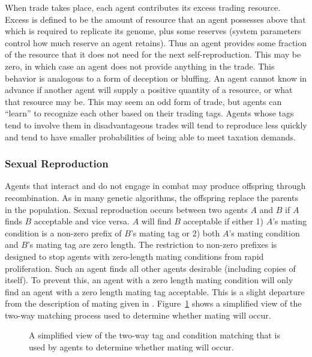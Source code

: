 When trade takes place, each agent contributes its excess trading
resource.  Excess is defined to be the amount of resource that an
agent possesses above that which is required to replicate its genome,
plus some reserves (system parameters control how much reserve an
agent retains).  Thus an agent provides some fraction of the resource
that it does not need for the next self-reproduction. This may be
zero, in which case an agent does not provide anything in the
trade. This behavior is analogous to a form of deception or
bluffing. An agent cannot know in advance if another agent will supply
a positive quantity of a resource, or what that resource may be. This
may seem an odd form of trade, but agents can ``learn'' to recognize
each other based on their trading tags. Agents whose tags tend to
involve them in disadvantageous trades will tend to reproduce less
quickly and tend to have smaller probabilities of being able to meet
taxation demands.

\subsubsection{Sexual Reproduction}

Agents that interact and do not engage in combat may produce offspring
through recombination. As in many genetic algorithms, the
offspring replace the parents in the population. Sexual reproduction
occurs between two agents $A$ and $B$ if $A$ finds $B$ acceptable and
vice versa. $A$ will find $B$ acceptable if either 1) $A$'s mating
condition is a non-zero prefix of $B$'s mating tag or 2) both $A$'s
mating condition and $B$'s mating tag are zero length. The restriction
to non-zero prefixes is designed to stop agents with zero-length
mating conditions from rapid proliferation. Such an agent finds all
other agents desirable (including copies of itself). To prevent this,
an agent with a zero length mating condition will only find an agent
with a zero length mating tag acceptable. This is a slight departure
from the description of mating given in \cite{Holland92}.
Figure~\ref{fig:agent-agent} shows a simplified view of the two-way
matching process used to determine whether mating will occur.

\begin{figure}
\begin{center}
\leavevmode
\epsfysize=3in
\caption{A simplified view of the two-way tag and condition matching
that is used by agents to determine whether mating will occur.
\label{fig:agent-agent}}
\end{center}
\end{figure}

